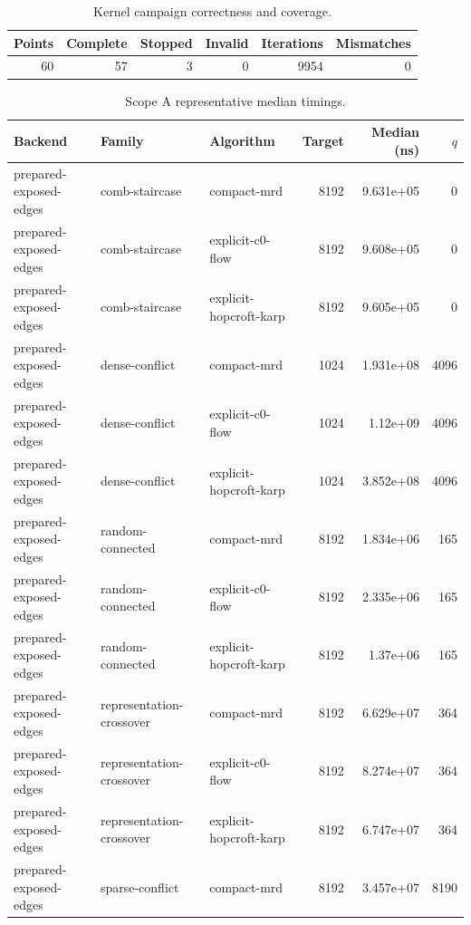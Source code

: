\begin{table}[t]
\caption{Kernel campaign correctness and coverage.}
\label{tab:kernel-coverage}
\begin{tabular}{rrrrrr}
\toprule
Points & Complete & Stopped & Invalid & Iterations & Mismatches \\
\midrule
60 & 57 & 3 & 0 & 9954 & 0 \\
\bottomrule
\end{tabular}
\end{table}

\begin{table}[t]
\caption{Scope A representative median timings.}
\label{tab:kernel-scope-a}
\begin{tabular}{lllrrr}
\toprule
Backend & Family & Algorithm & Target & Median (ns) & $q$ \\
\midrule
prepared-exposed-edges & comb-staircase & compact-mrd & 8192 & 9.631e+05 & 0 \\
prepared-exposed-edges & comb-staircase & explicit-c0-flow & 8192 & 9.608e+05 & 0 \\
prepared-exposed-edges & comb-staircase & explicit-hopcroft-karp & 8192 & 9.605e+05 & 0 \\
prepared-exposed-edges & dense-conflict & compact-mrd & 1024 & 1.931e+08 & 4096 \\
prepared-exposed-edges & dense-conflict & explicit-c0-flow & 1024 & 1.12e+09 & 4096 \\
prepared-exposed-edges & dense-conflict & explicit-hopcroft-karp & 1024 & 3.852e+08 & 4096 \\
prepared-exposed-edges & random-connected & compact-mrd & 8192 & 1.834e+06 & 165 \\
prepared-exposed-edges & random-connected & explicit-c0-flow & 8192 & 2.335e+06 & 165 \\
prepared-exposed-edges & random-connected & explicit-hopcroft-karp & 8192 & 1.37e+06 & 165 \\
prepared-exposed-edges & representation-crossover & compact-mrd & 8192 & 6.629e+07 & 364 \\
prepared-exposed-edges & representation-crossover & explicit-c0-flow & 8192 & 8.274e+07 & 364 \\
prepared-exposed-edges & representation-crossover & explicit-hopcroft-karp & 8192 & 6.747e+07 & 364 \\
prepared-exposed-edges & sparse-conflict & compact-mrd & 8192 & 3.457e+07 & 8190 \\

\end{tabular}
\end{table}
